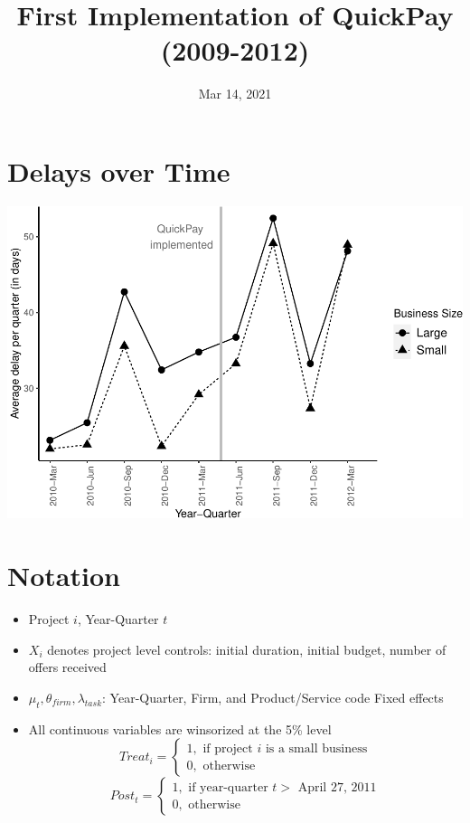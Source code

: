 \documentclass[
]{article}
\title{First Implementation of QuickPay (2009-2012)}
\author{}
\date{\vspace{-2.5em}Mar 14, 2021}
\providecommand{\tightlist}{%
  \setlength{\itemsep}{0pt}\setlength{\parskip}{0pt}}
\begin{document}
\maketitle

\hypertarget{delays-over-time}{%
\section{Delays over Time}\label{delays-over-time}}

\includegraphics{qp_first_implementation_files/figure-latex/plot-1.pdf}

\hypertarget{notation}{%
\section{Notation}\label{notation}}

\begin{itemize}
\tightlist
\item
  Project \(i\), Year-Quarter \(t\)
\item
  \(X_i\) denotes project level controls: initial duration, initial
  budget, number of offers received
\item
  \(\mu_t,\theta_{firm},\lambda_{task}\): Year-Quarter, Firm, and
  Product/Service code Fixed effects
\item
  All continuous variables are winsorized at the 5\% level
  \[ Treat_i = \begin{cases} 1, \text{ if project } i \text{ is a small business}\\
  0, \text{ otherwise} \end{cases}\]
  \[ Post_t = \begin{cases} 1, \text{ if year-quarter } t > \text{ April 27, 2011}\\
  0, \text{ otherwise} \end{cases}\]
\end{itemize}
\end{document}
